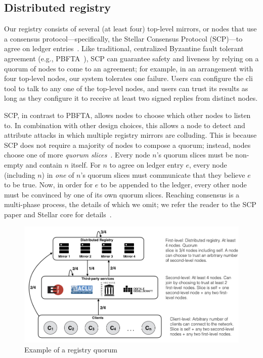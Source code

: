 \subsection{Distributed registry}
Our registry consists of several (at least four) top-level mirrors, or nodes
that use a consensus protocol---specifically, the Stellar Consensus Protocol
(SCP)---to agree on ledger entries~\cite{stellar}. Like traditional,
centralized Byzantine fault tolerant agreement (e.g., PBFTA~\cite{pbfts}), SCP
can guarantee safety and liveness by relying on a quorum of nodes to come to an
agreement; for example, in an arrangement with four top-level nodes, our system
tolerates one failure. Users can configure the \spam{} cli tool to talk to any
one of the top-level nodes, and users can trust its results as long as they
configure it to receive at least two signed replies from distinct nodes.

SCP, in contrast to PBFTA, allows nodes to choose which other nodes to listen
to. In combination with other design choices, this allows a node to detect and
attribute attacks in which multiple registry mirrors are colluding. This is
because SCP does not require a majority of nodes to compose a quorum; instead,
nodes choose one of more \emph{quorum slices}~\cite{stellar}. Every node $n$'s
quorum slices must be non-empty and contain $n$ itself. For $n$ to agree on
ledger entry $e$, every node (including $n$) in \emph{one} of $n$'s quorum
slices must communicate that they believe $e$ to be true. Now, in order for $e$
to be appended to the ledger, every other node must be convinced by one of its
own quorum slices. Reaching consensus is a multi-phase process, the details of
which we omit; we refer the reader to the SCP paper and Stellar core for
details~\cite{stellar,core}.

\begin{figure}[h]
  \includegraphics[width=\textwidth]{figures/quorum}
  \caption{Example of a registry quorum} 
  \label{fig:quorum-spam}
\end{figure}

